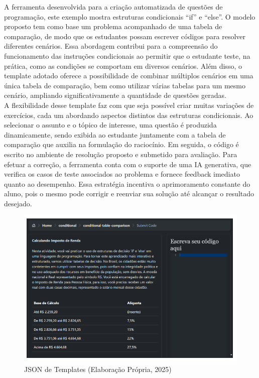 A ferramenta desenvolvida para a criação automatizada de questões de programação, este exemplo mostra estruturas condicionais “if” e “else”. O modelo proposto  tem como base um problema acompanhado de uma tabela de comparação, de modo que os estudantes possam escrever códigos para resolver diferentes cenários. Essa abordagem contribui para a compreensão do funcionamento das instruções condicionais ao permitir que o estudante teste, na prática, como as condições se comportam em diversos cenários. Além disso, o template adotado oferece a possibilidade de combinar múltiplos cenários em uma única tabela de comparação, bem como utilizar várias tabelas para um mesmo cenário, ampliando significativamente a quantidade de questões geradas. 
\\
A flexibilidade desse template faz com que seja possível criar muitas variações de exercícios, cada um abordando aspectos distintos das estruturas condicionais. Ao selecionar o assunto e o tópico de interesse, uma questão é produzida dinamicamente, sendo exibida ao estudante juntamente com a tabela de comparação que auxilia na formulação do raciocínio. Em seguida, o código é escrito no ambiente de resolução proposto e submetido para avaliação. Para efetuar a correção, a ferramenta conta com o suporte de uma IA generativa, que verifica os casos de teste associados ao problema e fornece feedback imediato quanto ao desempenho. Essa estratégia incentiva o aprimoramento constante do aluno, pois o mesmo pode corrigir e reenviar sua solução até alcançar o resultado desejado. 

\begin{figure}[ht]
	\centering
	\includegraphics[width=14cm]{./imagens/capitulo7/ferramenta}
	\caption{JSON de Templates (Elaboração Própria, 2025) }
	\label{fig:ferramenta}
\end{figure}

